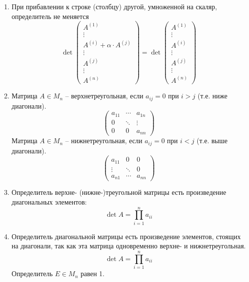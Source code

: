 \documentclass[a4paper,12pt]{article}
\begin{document}
\begin{enumerate}
		\item При прибавлении к строке (столбцу) другой, умноженной на скаляр, определитель не меняется
		\[
		\det\left(
		\begin{matrix}
		A^{(1)} \\
		\vdots \\
		A^{(i)} + \alpha \cdot A^{(j)}\\
		\vdots \\
		A^{(j)} \\
		\vdots \\
		A^{(n)}
		
		\end{matrix}
		\right)
		=
		\det\left(
		\begin{matrix}
		A^{(1)}\\
		\vdots\\
		A^{(i)}\\
		\vdots\\
		A^{(j)}\\
		\vdots\\
		A^{(n)}
		
		\end{matrix}
		\right)
		\]
		\item 	
		Матрица $A \in  M_n$ – $\textbf{верхнетреугольная}$, если
		$a_{ij} = 0$  при  $i > j$  (т.е. ниже диагонали).
		\[
		\begin{pmatrix}
			a_{11} & \cdots & a_{1n} \\
			0      & \ddots & \vdots \\
			0      & 0      & a_{nn}
		\end{pmatrix}
		\]
		Матрица $A \in  M_n$ – $\textbf{нижнетреугольная}$, если
		$a_{ij} = 0$  при  $i < j$  (т.е. выше диагонали).
		\[
		\begin{pmatrix}
		a_{11} & 0 & 0 \\
		\vdots      & \ddots & 0 \\
		a_{n1}     & \cdots      & a_{nn}
		\end{pmatrix}
		\]
		
		\item Определитель верхне- (нижне-)треугольной матрицы есть произведение диагональных элементов:
		\[
		\det A = \prod_{i = 1}^{n} a_{ii}
		\]
		\item Определитель диагональной матрицы есть произведение элементов, стоящих на диагонали, так как эта матрица одновременно верхне- и нижнетреугольная.
		\[
		\det A = \prod_{i = 1}^{n} a_{ii}
		\]
		Определитель $E \in M_n$ равен 1.
		

\end{enumerate}
\end{document}

